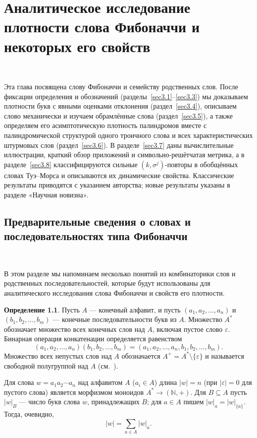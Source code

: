 \documentclass[a4paper,14pt]{extreport}
\theoremstyle{plain}
\theoremstyle{definition}
\newtheorem{definition}{Определение}[section]
\theoremstyle{remark}
\begin{document}
\chapter{Аналитическое исследование плотности слова Фибоначчи и некоторых его свойств}~\label{sec3}

Эта глава посвящена слову Фибоначчи и семейству родственных слов. После фиксации определения и обозначений (разделы~\ref{sec3.1}--\ref{sec3.3}) мы доказываем плотности букв с явными оценками отклонения (раздел~\ref{sec3.4}), описываем слово механически и изучаем обрамлённые слова (раздел~\ref{sec3.5}), а также определяем его асимптотическую плотность палиндромов вместе с палиндромической структурой одного троичного слова и всех характеристических штурмовых слов (раздел~\ref{sec3.6}). В разделе~\ref{sec3.7} даны вычислительные иллюстрации, краткий обзор приложений и символьно-решётчатая метрика, а в разделе~\ref{sec3.8} классифицируются сильные $(k,\sigma^j)$-повторы в обобщённых словах Туэ--Морса и описываются их динамические свойства. Классические результаты приводятся с указанием авторства; новые результаты указаны в разделе «Научная новизна».
\section{Предварительные сведения о словах и последовательностях типа Фибоначчи}~\label{sec3.1}

В этом разделе мы напоминаем несколько понятий из комбинаторики слов и родственных последовательностей, которые будут использованы для аналитического исследования слова Фибоначчи и свойств его плотности.

\begin{definition}
	Пусть $A$ --- конечный алфавит, и пусть $(a_1,a_2,\ldots,a_n)$ и $(b_1,b_2,\ldots,b_m)$ --- конечные последовательности букв из $A$. Множество $A^*$ обозначает множество всех конечных слов над $A$, включая пустое слово $\varepsilon$. Бинарная операция конкатенации определяется равенством
	\begin{equation}
		(a_1,a_2,\dots,a_n) (b_1,b_2,\dots,b_m)
		= (a_1,a_2,\dots,a_n,b_1,b_2,\dots,b_m).
	\end{equation}
	Множество всех непустых слов над $A$ обозначается $A^+ = A^*\setminus\{\varepsilon\}$ и называется свободной полугруппой над $A$ (см.~\cite{Lothaire}).
\end{definition}

Для слова $w = a_1 a_2 \cdots a_n$ над алфавитом $A$ ($a_i \in A$) длина $|w| = n$ (при $|\varepsilon| = 0$ для пустого слова) является морфизмом моноидов $A^* \to (\mathbb{N},+)$. Для $B \subseteq A$ пусть $|w|_B$ --- число букв слова $w$, принадлежащих $B$; для $a \in A$ пишем $|w|_a = |w|_{\{a\}}$. Тогда, очевидно,
\begin{equation}
	|w| = \sum_{a \in A} |w|_a.
\end{equation}
\end{document}
